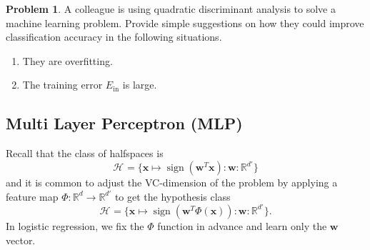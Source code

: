 \documentclass[10pt]{exam}
\theoremstyle{definition}
\newtheorem{problem}{Problem}
\newtheorem{note}{Note}
\newcommand{\R}{\mathbb R}
\DeclareMathOperator{\sign}{sign}
\newcommand{\Ein}{E_{\text{in}}}
\newcommand{\trans}[1]{{#1}^{T}}
\newcommand{\w}{\mathbf w}
\newcommand{\x}{\mathbf x}
\newcommand{\HH}[1]{\mathcal H_{\text{#1}}}
\begin{document}



\newpage
\begin{problem}
    A colleague is using quadratic discriminant analysis to solve a machine learning problem.
    Provide simple suggestions on how they could improve classification accuracy in the following situations.
    \begin{enumerate}
        \item
            They are overfitting.
            \vspace{4in}
        \item
            The training error $\Ein$ is large.
    \end{enumerate}
\end{problem}


\newpage
\subsection{Multi Layer Perceptron (MLP)}

Recall that the class of halfspaces is
\begin{equation}
    \HH{} = \bigg\{ \x \mapsto \sign(\trans\w \x) : \w : \R^{d'} \bigg\}
\end{equation}
and it is common to adjust the VC-dimension of the problem by applying a feature map
$\Phi : \R^d \to \R^{d'}$ to get the hypothesis class
\begin{equation}
    \HH{} = \bigg\{ \x \mapsto \sign(\trans\w \Phi(\x)) : \w : \R^{d'} \bigg\}
    .
\end{equation}
In logistic regression, we fix the $\Phi$ function in advance and learn only the $\w$ vector.
\end{document}
